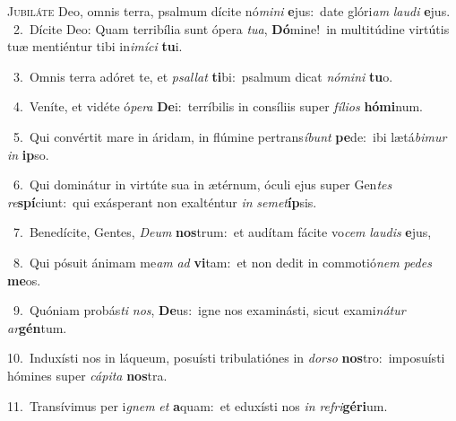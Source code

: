 \lettrine{\initial\textcolor{\initialcolor}{J}}{ubiláte} Deo, omnis terra, psalmum dícite nó\-\textit{mi}\-\textit{ni} \textbf{e}\-jus:~\star date glóri\textit{am} \textit{lau}\-\textit{di} \textbf{e}\-jus.\\
{\numbfont\textcolor{\numbcolor}{~2.}}~Dícite Deo: Quam terribília sunt ópera \textit{tu}\-\textit{a}, \textbf{Dó}\-mine!~\star in multitúdine virtútis tuæ mentiéntur tibi in\-\textit{i}\-\textit{mí}\textit{ci} \textbf{tu}\-i.\par
{\numbfont\textcolor{\numbcolor}{~3.}}~Omnis terra adóret te, et \textit{psal}\-\textit{lat} \textbf{ti}\-bi:~\star psalmum dicat \textit{nó}\-\textit{mi}\textit{ni} \textbf{tu}\-o.\par
{\numbfont\textcolor{\numbcolor}{~4.}}~Veníte, et vidéte ó\-\textit{pe}\-\textit{ra} \textbf{De}\-i:~\star terríbilis in consíliis super \textit{fí}\-\textit{li}\textit{os} \textbf{hó}\-\textbf{mi}num.\par
{\numbfont\textcolor{\numbcolor}{~5.}}~Qui convértit mare in áridam, in flúmine pertrans\-\textit{í}\-\textit{bunt} \textbf{pe}\-de:~\star ibi lætá\-\textit{bi}\-\textit{mur} \textit{in} \textbf{ip}\-so.\par
{\numbfont\textcolor{\numbcolor}{~6.}}~Qui dominátur in virtúte sua in ætérnum, óculi ejus super Gen\textit{tes} \textit{re}\-\textbf{spí}ciunt:~\star qui exásperant non exalténtur \textit{in} \textit{se}\-\textit{met}\textbf{íp}sis.\par
{\numbfont\textcolor{\numbcolor}{~7.}}~Benedícite, Gentes, \textit{De}\-\textit{um} \textbf{nos}\-trum:~\star et audítam fácite vo\textit{cem} \textit{lau}\-\textit{dis} \textbf{e}\-jus,\par
{\numbfont\textcolor{\numbcolor}{~8.}}~Qui pósuit ánimam me\textit{am} \textit{ad} \textbf{vi}\-tam:~\star et non dedit in commotió\textit{nem} \textit{pe}\-\textit{des} \textbf{me}\-os.\par
{\numbfont\textcolor{\numbcolor}{~9.}}~Quóniam probás\textit{ti} \textit{nos}\-, \textbf{De}\-us:~\star igne nos examinásti, sicut exami\-\textit{ná}\-\textit{tur} \textit{ar}\-\textbf{gén}tum.\par
{\numbfont\textcolor{\numbcolor}{10.}}~Induxísti nos in láqueum, posuísti tribulatiónes in \textit{dor}\-\textit{so} \textbf{nos}\-tro:~\star imposuísti hómines super \textit{cá}\-\textit{pi}\textit{ta} \textbf{nos}\-tra.\par
{\numbfont\textcolor{\numbcolor}{11.}}~Transívimus per i\textit{gnem} \textit{et} \textbf{a}\-quam:~\star et eduxísti nos \textit{in} \textit{re}\-\textit{fri}\textbf{gé}\textbf{ri}um.\par
